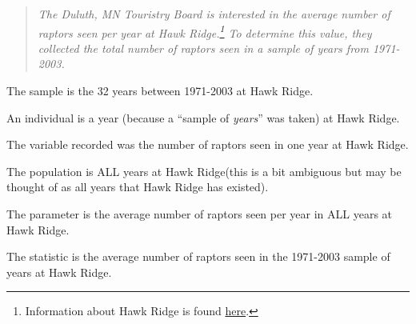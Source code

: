 \documentclass[10pt,openany]{book}\usepackage[]{graphicx}\usepackage[]{color}
\begin{document}
\begin{quote}
\textit{The Duluth, MN Touristry Board is interested in the average number of raptors seen per year at Hawk Ridge.\footnote{Information about Hawk Ridge is found \href{http://www.hawkridge.org/}{here}.}  To determine this value, they collected the total number of raptors seen in a sample of years from 1971-2003.}
\end{quote}

\begin{Itemize}
  \item The sample is the 32 years between 1971-2003 at Hawk Ridge.
  \item An individual is a year (because a ``sample of \emph{years}'' was taken) at Hawk Ridge.
  \item The variable recorded was the number of raptors seen in one year at Hawk Ridge.
  \item The population is ALL years at Hawk Ridge(this is a bit ambiguous but may be thought of as all years that Hawk Ridge has existed).
  \item The parameter is the average number of raptors seen per year in ALL years at Hawk Ridge.
  \item The statistic is the average number of raptors seen in the 1971-2003 sample of years at Hawk Ridge.
\end{Itemize}
\end{document}
